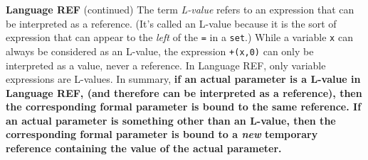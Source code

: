 \begin{minipage}[t]{\sw}
\slidenumber
\LARGE
{\bf Language REF} (continued)\exx
The term {\em L-value} refers to an expression
that can be interpreted as a reference.
(It's called an L-value because it is the sort of expression
that can appear to the {\em left} of the \verb'=' in a \verb'set'.)
While a variable \verb'x' can always be considered as an L-value,
the expression \verb'+(x,0)' can only be interpreted as
a value, never a reference.
In Language REF, only variable expressions are L-values.\exx
In summary,
{\bf if an actual parameter is a L-value in Language REF,
(and therefore can be interpreted as a reference),
then the corresponding formal parameter is bound to the same reference.
If an actual parameter is something other than an L-value,
then the corresponding formal parameter is bound
to a {\em new} temporary reference
containing the value of the actual parameter.}
\end{minipage}
\clearpage

